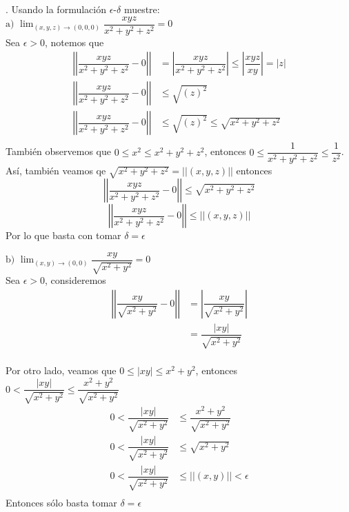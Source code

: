 \documentclass[letterpaper]{article}
\providecommand{\abs}[1]{\left|#1\right|}
\providecommand{\norm}[1]{\left|\left|#1\right|\right|}
\renewcommand{\*}{\cdot}
\theoremstyle{definition}
\begin{document}
.  Usando la formulación $\epsilon$-$\delta$ muestre: \\

\noindent$ \text{a) } \displaystyle\lim_{(x,y,z) \to (0,0,0)} \dfrac{xyz}{x^2 + y^2 + z^2} = 0$\\

Sea $ \epsilon > 0 $, notemos que 
\begin{align*}
	\norm{\dfrac{xyz}{x^2 + y^2 + z^2} - 0} &= \abs{\dfrac{xyz}{x^2 + y^2 + z^2} } \leq \abs{ \dfrac{xyz}{xy}  }  = \abs{z}\\
	\norm{\dfrac{xyz}{x^2 + y^2 + z^2} - 0} & \leq \sqrt{(z)^2}\\
	\norm{\dfrac{xyz}{x^2 + y^2 + z^2} - 0} & \leq \sqrt{(z)^2}\leq \sqrt{x^2 + y^2 + z^2} \\
\end{align*}
También observemos que $ 0 \leq x^2 \leq x^2 + y^2 + z^2$, entonces $ 0 \leq \dfrac{1}{x^2 + y^2 + z^2} \leq \dfrac{1}{z^2} $.\\
Así, también veamos qe $ \sqrt{x^2 + y^2 + z^2}  = \norm{(x,y,z)} $ entonces
\[ \norm{\dfrac{xyz}{x^2 + y^2 + z^2} - 0} \leq \sqrt{x^2 + y^2 + z^2} \]
\[ \norm{\dfrac{xyz}{x^2 + y^2 + z^2} - 0} \leq \norm{(x,y,z)} \]
Por lo que basta con tomar $ \delta = \epsilon $

$\text{b) }\displaystyle\lim_{(x,y) \to (0,0)} \dfrac{xy }{\sqrt{x^2 + y^2}} = 0$\\
Sea $ \epsilon > 0 $, consideremos 
\begin{align*}
	\norm{\dfrac{xy}{\sqrt{x^2 + y^2}} - 0} &= \abs{\dfrac{xy}{\sqrt{x^2 + y^2}}}\\
	&= \dfrac{\abs{xy}}{\sqrt{x^2 + y^2}}\\
\end{align*}

Por otro lado, veamos que $ 0 \leq \abs{xy} \leq x^2 + y^2 $, entonces $ 0 < \dfrac{\abs{xy}}{\sqrt{x^2 + y^2}} \leq \dfrac{x^2 + y^2}{\sqrt{x^2 + y^2}} $
\begin{align*}
	0 < \dfrac{\abs{xy}}{\sqrt{x^2 + y^2}} &\leq \dfrac{x^2 + y^2}{\sqrt{x^2 + y^2}}\\
	0 < \dfrac{\abs{xy}}{\sqrt{x^2 + y^2}} &\leq \sqrt{x^2 + y^2}\\
	0 < \dfrac{\abs{xy}}{\sqrt{x^2 + y^2}} &\leq \norm{(x,y)} < \epsilon\\
\end{align*}
Entonces sólo basta tomar $ \delta = \epsilon $\\
\end{document}
